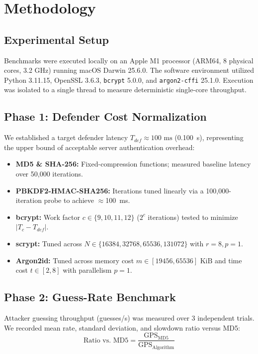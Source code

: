 \documentclass[conference]{IEEEtran}
\begin{document}
\section{Methodology}
\subsection{Experimental Setup}
Benchmarks were executed locally on an Apple M1 processor (ARM64, 8 physical cores, 3.2 GHz) running macOS Darwin 25.6.0. The software environment utilized Python 3.11.15, OpenSSL 3.6.3, \texttt{bcrypt} 5.0.0, and \texttt{argon2-cffi} 25.1.0. Execution was isolated to a single thread to measure deterministic single-core throughput.

\subsection{Phase 1: Defender Cost Normalization}
We established a target defender latency $T_{def} \approx 100\text{ ms}$ (0.100~s), representing the upper bound of acceptable server authentication overhead:
\begin{itemize}
    \item \textbf{MD5 \& SHA-256:} Fixed-compression functions; measured baseline latency over 50,000 iterations.
    \item \textbf{PBKDF2-HMAC-SHA256:} Iterations tuned linearly via a 100,000-iteration probe to achieve $\approx$100~ms.
    \item \textbf{bcrypt:} Work factor $c \in \{9, 10, 11, 12\}$ ($2^c$ iterations) tested to minimize $|T_c - T_{def}|$.
    \item \textbf{scrypt:} Tuned across $N \in \{16384, 32768, 65536, 131072\}$ with $r=8, p=1$.
    \item \textbf{Argon2id:} Tuned across memory cost $m \in [19456, 65536]\text{ KiB}$ and time cost $t \in [2, 8]$ with parallelism $p=1$.
\end{itemize}

\subsection{Phase 2: Guess-Rate Benchmark}
Attacker guessing throughput (guesses/s) was measured over 3 independent trials. We recorded mean rate, standard deviation, and slowdown ratio versus MD5:
\begin{equation}
\text{Ratio vs. MD5} = \frac{\text{GPS}_{\text{MD5}}}{\text{GPS}_{\text{Algorithm}}}
\end{equation}
\end{document}
